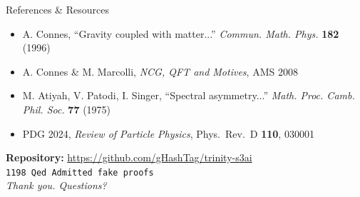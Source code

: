 \documentclass[aspectratio=169,11pt]{beamer}
\begin{document}
\begin{frame}{References \& Resources}
  \begin{itemize}
    \item A. Connes, ``Gravity coupled with matter...'' \textit{Commun. Math. Phys.} \textbf{182} (1996)
    \item A. Connes \& M. Marcolli, \textit{NCG, QFT and Motives}, AMS 2008
    \item M. Atiyah, V. Patodi, I. Singer, ``Spectral asymmetry...'' \textit{Math. Proc. Camb. Phil. Soc.} \textbf{77} (1975)
    \item PDG 2024, \textit{Review of Particle Physics}, Phys.\ Rev.\ D \textbf{110}, 030001
  \end{itemize}
  \vfill
  \begin{center}
    \textbf{Repository:} \url{https://github.com/gHashTag/trinity-s3ai}\\[0.5em]
    \texttt{1198 Qed  Admitted  fake proofs}\\[0.5em]
    \textit{Thank you. Questions?}
  \end{center}
\end{frame}
\end{document}
